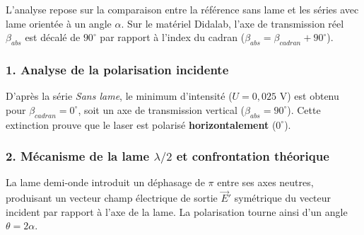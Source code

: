 \documentclass[a4paper,9pt,french]{scrartcl}
\begin{document}




L'analyse repose sur la comparaison entre la référence sans lame et les séries avec lame orientée à un angle $\alpha$. Sur le matériel Didalab, l'axe de transmission réel $\beta_{abs}$ est décalé de $90^\circ$ par rapport à l'index du cadran ($\beta_{abs} = \beta_{cadran} + 90^\circ$).

\subsubsection*{1. Analyse de la polarisation incidente}
D'après la série \textit{Sans lame}, le minimum d'intensité ($U = 0,025$ V) est obtenu pour $\beta_{cadran} = 0^\circ$, soit un axe de transmission vertical ($\beta_{abs} = 90^\circ$). Cette extinction prouve que le laser est polarisé \textbf{horizontalement} ($0^\circ$).

\subsubsection*{2. Mécanisme de la lame $\lambda/2$ et confrontation théorique}
La lame demi-onde introduit un déphasage de $\pi$ entre ses axes neutres, produisant un vecteur champ électrique de sortie $\vec{E}'$ symétrique du vecteur incident par rapport à l'axe de la lame. La polarisation tourne ainsi d'un angle $\theta = 2\alpha$.
\end{document}
